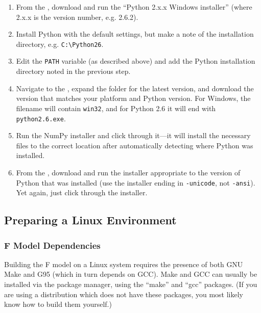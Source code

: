 \begin{enumerate}

\item From the , download and run the 
``Python 2.x.x Windows installer'' (where 2.x.x is the version number, e.g. 2.6.2).

\item Install Python with the default settings, but make a note of the installation directory, e.g.
\verb|C:\Python26|.

\item Edit the \verb|PATH| variable (as described above) and add the Python installation directory 
noted in the previous step.

\item Navigate to the , expand 
the folder for the latest version, and download the version that matches your platform and Python 
version.  For Windows, the filename will contain \verb|win32|, and for Python 2.6 it will end with 
\verb|python2.6.exe|.

\item Run the NumPy installer and click through it---it will install the necessary files to the 
correct location after automatically detecting where Python was installed.

\item From the , 
download and run the installer appropriate to the version of Python that was installed (use the 
installer ending in \verb|-unicode|, not \verb|-ansi|).  Yet again, just click through the 
installer.

\end{enumerate}


\subsection{Preparing a Linux Environment}
\label{dev:linux}

\subsubsection{F Model Dependencies}

Building the F model on a Linux system requires the presence of both GNU Make and G95 (which in turn 
depends on GCC).  Make and GCC can usually be installed via the package manager, using the ``make'' 
and ``gcc'' packages.  (If you are using a distribution which does not have these packages, you most 
likely know how to build them yourself.)

